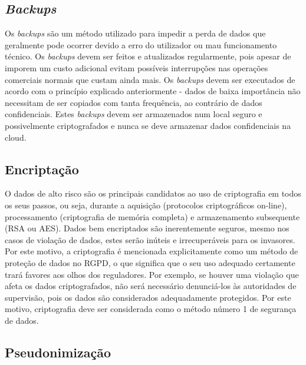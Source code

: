 \subsection{\textit{Backups}}

Os \textit{backups} são um método utilizado para impedir a perda de dados que geralmente pode ocorrer devido a erro do utilizador ou mau funcionamento técnico. Os \textit{backups} devem ser feitos e atualizados regularmente, pois apesar de imporem um custo adicional evitam possíveis interrupções nas operações comerciais normais que custam ainda mais. 
Os \textit{backups} devem ser executados de acordo com o princípio explicado anteriormente - dados de baixa importância não necessitam de ser copiados com tanta frequência, ao contrário de dados confidenciais. Estes \textit{backups} devem ser armazenados num local seguro e possivelmente criptografados e nunca se deve armazenar dados confidenciais na cloud. 

\subsection{Encriptação}

O dados de alto risco são os principais candidatos ao uso de criptografia em todos os seus passos, ou seja, durante a aquisição (protocolos criptográficos on-line), processamento (criptografia de memória completa) e armazenamento subsequente (RSA ou AES). Dados bem encriptados são inerentemente seguros, mesmo nos casos de violação de dados, estes serão inúteis e irrecuperáveis para os invasores.
Por este motivo, a criptografia é mencionada explicitamente como um método de proteção de dados no \ac{RGPD}, o que significa que o seu uso adequado certamente trará favores aos olhos dos reguladores. Por exemplo, se houver uma violação que afeta os dados criptografados, não será necessário denunciá-los às autoridades de supervisão, pois os dados são considerados adequadamente protegidos. Por este motivo, criptografia deve ser considerada como o método número 1 de segurança de dados.

\subsection{Pseudonimização}

